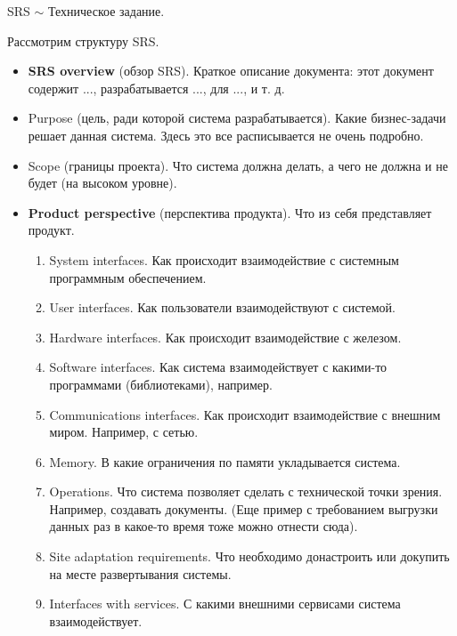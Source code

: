     \begin{Def}[SRS]
        SRS $\sim$ Техническое задание.
    \end{Def}

    \begin{Def}
        Рассмотрим структуру SRS.
        \begin{itemize}
            \item \textbf{SRS overview} (обзор SRS). Краткое описание документа: этот документ содержит ..., разрабатывается ..., для ..., и т. д.
            
            \item Purpose (цель, ради которой система разрабатывается). Какие бизнес-задачи решает данная система. Здесь это все расписывается не очень подробно. 
            
            \item Scope (границы проекта). Что система должна делать, а чего не должна и не будет (на высоком уровне).
            
            \item \textbf{Product perspective} (перспектива продукта). Что из себя представляет продукт.
            \begin{enumerate}
                \item System interfaces. Как происходит взаимодействие с системным программным обеспечением.
                \item User interfaces. Как пользователи взаимодействуют с системой.
                \item Hardware interfaces. Как происходит взаимодействие с железом.
                \item Software interfaces. Как система взаимодействует с какими-то программами (библиотеками), например. 
                \item Communications interfaces. Как происходит взаимодействие с внешним миром. Например, с сетью.
                \item Memory. В какие ограничения по памяти укладывается система.
                \item Operations. Что система позволяет сделать с технической точки зрения. Например, создавать документы. (Еще пример с требованием выгрузки данных раз в какое-то время тоже можно отнести сюда).
                \item Site adaptation requirements. Что необходимо донастроить или докупить на месте развертывания системы.
                \item Interfaces with services. С какими внешними сервисами система взаимодействует.
            \end{enumerate}


\end{itemize}
\end{Def}
